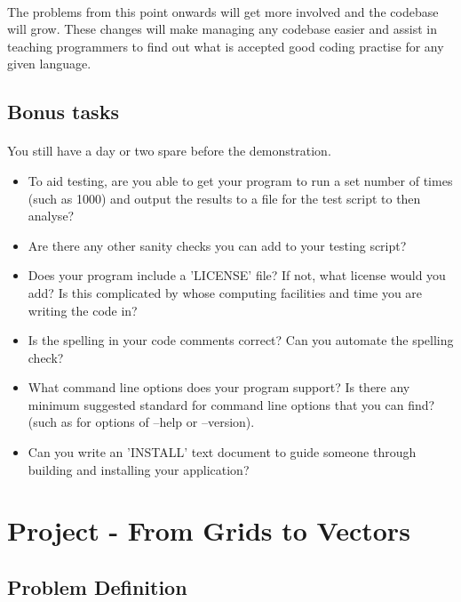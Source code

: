 \documentclass[11pt]{book}
\begin{document}
\paragraph{} The problems from this point onwards will get more involved and the codebase will grow. These changes will make managing any codebase easier and assist in teaching programmers to find out what is accepted good coding practise for any given language.

\subsection{Bonus tasks}

\paragraph{} You still have a day or two spare before the demonstration.

\begin{itemize}
\item To aid testing, are you able to get your program to run a set number of times (such as 1000) and output the results to a file for the test script to then analyse?
\item Are there any other sanity checks you can add to your testing script?
\item Does your program include a 'LICENSE' file? If not, what license would you add? Is this complicated by whose computing facilities and time you are writing the code in?
\item Is the spelling in your code comments correct? Can you automate the spelling check?
\item What command line options does your program support? Is there any minimum suggested standard for command line options that you can find? (such as for options of --help or --version).
\item Can you write an 'INSTALL' text document to guide someone through building and installing your application?
\end{itemize}

\clearpage



\section{Project - From Grids to Vectors}

\subsection{Problem Definition}
\end{document}
